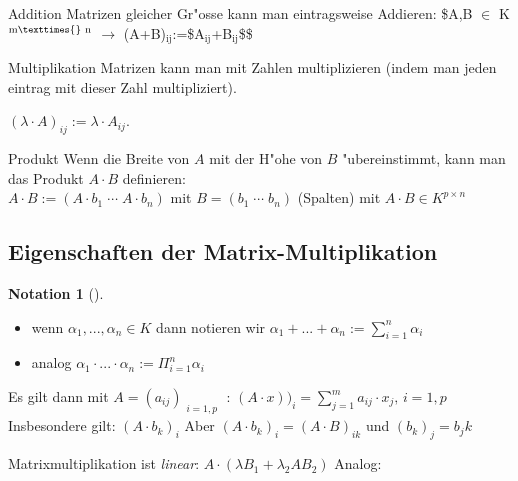 \documentclass[11pt]{article}
\theoremstyle{remark}
\theoremstyle{definition}
\newtheorem*{notation}{Notation}
\theoremstyle{remark}
\begin{document}
\begin{definition}{Addition}{}
Matrizen gleicher Gr"osse kann man eintragsweise Addieren: \$A,B \(\in\) K\(^{\text{m}\texttimes{}\text{
n}}\) \(\rightarrow\) (A+B)\(_{\text{ij}}\):=\$A\(_{\text{ij}}\)+B\(_{\text{ij}}\)\$\$
\end{definition}

\begin{definition}{Multiplikation}{}
Matrizen kann man mit Zahlen multiplizieren (indem man jeden eintrag mit dieser
Zahl multipliziert).

\((\lambda \cdot A)_{ij}:=\lambda \cdot A_{ij}\).
\end{definition}

\begin{definition}{Produkt}{}
Wenn die Breite von \(A\) mit der H"ohe von \(B\) "ubereinstimmt, kann man das
Produkt \(A\cdot B\) definieren: \\
\(A\cdot B:=(A\cdot b_1\; \cdots \; A\cdot b_n)\) mit \(B=(b_1\; \cdots\; b_n)\) (Spalten)
mit \(A\cdot B \in K^{p\times n}\)
\end{definition}

\subsection{Eigenschaften der Matrix-Multiplikation}
\label{sec:org8eaaee0}
\begin{notation}[] \label{}
\begin{itemize}
\item wenn \(\alpha_1,...,\alpha_n\in K\) dann notieren wir \(\alpha_1+...+\alpha_n :=
   \sum_{i=1}^{n}{\alpha_i}\)
\item analog \(\alpha_1\cdot ...\cdot\alpha_n := \Pi_{i=1}^{n}{\alpha_i}\)
\end{itemize}
\end{notation}

\begin{relation}
Es gilt dann mit \(A=(a_{ij})_{\substack{i=1,p}}\) : \((A\cdot
x))_i=\sum_{j=1}^{m}{a_{ij}\cdot x_j,\, i=1,p}\) \\

Insbesondere gilt: \((A\cdot b_k)_i\) Aber \((A\cdot b_k)_i = (A\cdot B)_{ik}\) und \((b_k)_j=b_jk\)
\end{relation}

\begin{relation}
Matrixmultiplikation ist \emph{linear}: \(A\cdot (\lambda B_1 + \lambda_2 A B_2)\)
Analog:
\end{relation}
\end{document}
